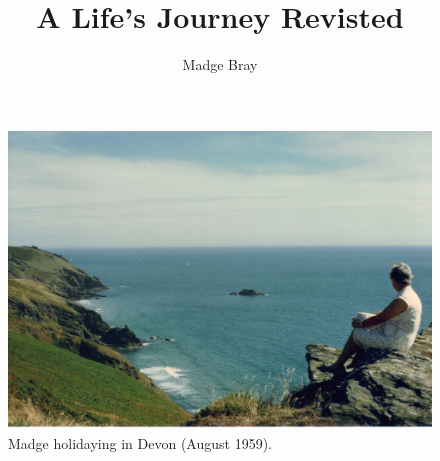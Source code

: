\documentclass[12pt, a4paper, twoside]{book} %
\begin{document}
\frontmatter %
    \title{A Life's Journey Revisted}
    \author{Madge Bray}
    \maketitle

    \clearpage
    \thispagestyle{empty} %
    \phantom{a}
    \clearpage

    \thispagestyle{empty}
    \begin{figure}
      \includegraphics[width=\textwidth]{photos/madge-by-sea.jpg}
      \caption{Madge holidaying in Devon (August 1959).}
      \label{madge-by-sea}
    \end{figure}

    \clearpage
    \thispagestyle{empty}

    \tableofcontents
    \setcounter{page}{1}
    \clearpage
    \thispagestyle{empty}


    
    


\mainmatter  %
    


\appendix
    
    

\backmatter
\end{document}
